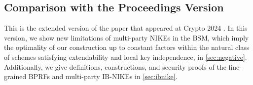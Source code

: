 \subsection{Comparison with the Proceedings Version}
This is the extended version of the paper that appeared at Crypto 2024 \cite{C:WanSuPan24}. In this version, we show new limitations of multi-party NIKEs in the BSM, which imply the optimality of our construction up to constant factors within the natural class of schemes satisfying extendability and local key independence, in \cref{sec:negative}. Additionally, we give definitions, constructions, and security proofs of the fine-grained BPRFs and multi-party IB-NIKEs in \cref{sec:ibnike}.









